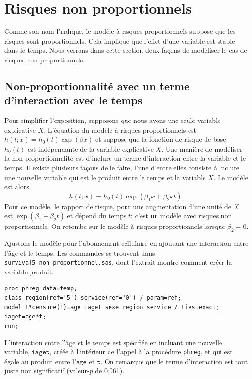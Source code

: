 \documentclass[
  11pt,
  letterpaper,
]{book}
\theoremstyle{definition}
\theoremstyle{definition}
\theoremstyle{definition}
\theoremstyle{remark}
\begin{document}
\hypertarget{risques-non-proportionnels}{%
\section{Risques non proportionnels}\label{risques-non-proportionnels}}

Comme son nom l'indique, le modèle à risques proportionnels suppose que les risques sont proportionnels. Cela implique que l'effet d'une variable est stable dans le temps. Nous verrons dans cette section deux façons de modéliser le cas de risques non proportionnels.

\hypertarget{non-proportionnalituxe9-avec-un-terme-dinteraction-avec-le-temps}{%
\subsection{Non-proportionnalité avec un terme d'interaction avec le temps}\label{non-proportionnalituxe9-avec-un-terme-dinteraction-avec-le-temps}}

Pour simplifier l'exposition, supposons que nous avons une seule variable explicative \(X\). L'équation du modèle à risques proportionnels est \(h(t; x) = h_0(t)\exp(\beta x)\) et suppose que la fonction de risque de base \(h_0(t)\) est indépendante de la variable explicative \(X\). Une manière de modéliser la non-proportionnalité est d'inclure un terme d'interaction entre la variable et le temps. Il existe plusieurs façons de le faire, l'une d'entre elles consiste à inclure une nouvelle variable qui est le produit entre le temps et la variable \(X\). Le modèle est alors \[h(t; x) = h_0(t) \exp(\beta_1x + \beta_2xt).\]
Pour ce modèle, le rapport de risque, pour une augmentation d'une unité de \(X\) est \(\exp(\beta_1+ \beta_2t)\) et dépend du temps \(t\): c'est un modèle avec risques non proportionnels. On retombe sur le modèle à risques proportionnels lorsque \(\beta_2=0\).

Ajustons le modèle pour l'abonnement cellulaire en ajoutant une interaction entre l'âge et le temps. Les commandes se trouvent dans \texttt{survival5\_non\_proportionnel.sas}, dont l'extrait montre comment créer la variable produit.

\begin{verbatim}
proc phreg data=temp;
class region(ref='5') service(ref='0') / param=ref;
model t*censure(1)=age iaget sexe region service / ties=exact;
iaget=age*t; 
run;
\end{verbatim}

L'interaction entre l'âge et le temps est spécifiée en incluant une nouvelle variable, \(\texttt{iaget}\), créée à l'intérieur de l'appel à la procédure \texttt{phreg}, et qui est égale au produit entre l'\(\texttt{age}\) et \(\texttt{t}\). On remarque que le terme d'interaction est tout juste non significatif (valeur-\(p\) de 0,061).
\end{document}
